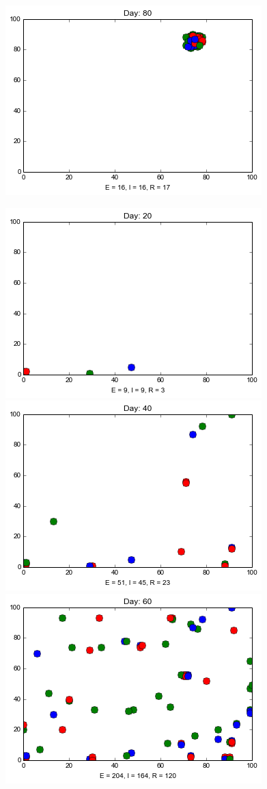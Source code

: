 \begin{minipage}{\linewidth}
\includegraphics[scale=0.28]{images/1t80.png} 

\medskip
\includegraphics[scale=0.28]{images/3t20.png} \quad
\includegraphics[scale=0.28]{images/3t40.png} \quad
\includegraphics[scale=0.28]{images/3t60.png} \quad

\end{minipage}
